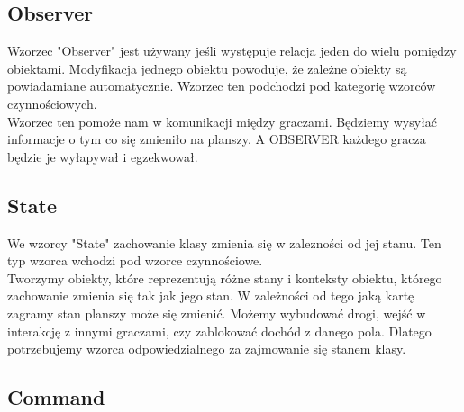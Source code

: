 \documentclass[a4paper, 11pt]{article}
\begin{document}
	\subsection{Observer}
	Wzorzec "Observer" jest używany jeśli występuje relacja jeden do wielu pomiędzy obiektami. Modyfikacja jednego obiektu powoduje, że zależne obiekty są powiadamiane automatycznie. Wzorzec ten podchodzi pod kategorię wzorców czynnościowych.\\
Wzorzec ten pomoże nam w komunikacji między graczami. Będziemy wysyłać informacje o tym co się zmieniło na planszy. A OBSERVER każdego gracza będzie je wyłapywał i egzekwował.
	\subsection{State}
	\indent
We wzorcy "State" zachowanie klasy zmienia się w zalezności od jej stanu. Ten typ wzorca wchodzi pod wzorce czynnościowe.\\
Tworzymy obiekty, które reprezentują różne stany i konteksty obiektu, którego zachowanie zmienia się tak jak jego stan.
W zależności od tego jaką kartę zagramy stan planszy może się zmienić. Możemy wybudować drogi, wejść w interakcję z innymi graczami, czy zablokować dochód z danego pola. Dlatego potrzebujemy wzorca odpowiedzialnego za zajmowanie się stanem klasy.
	\subsection{Command}
	
\end{document}
